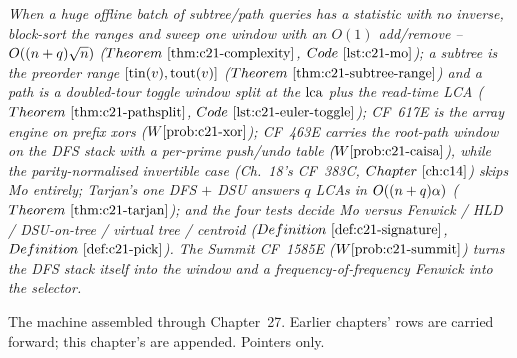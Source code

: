 \begin{recallbox}
\emph{When a huge offline batch of subtree/path queries has a statistic with no inverse,
block-sort the ranges and sweep one window with an \(O(1)\) add/remove --
\(O((n+q)\sqrt n)\) (\(\thmref{c21-complexity}\), \(\coderef{c21-mo}\)); a subtree is
the preorder range \([\operatorname{tin}(v),\operatorname{tout}(v)]\) (\(\thmref{c21-subtree-range}\)) and a path is a
doubled-tour toggle window split at the \(\operatorname{lca}\) plus the read-time LCA
(\(\thmref{c21-pathsplit}\), \(\coderef{c21-euler-toggle}\)); CF~617E is the array engine on
prefix xors (\(\probref{c21-xor}\)); CF~463E carries the root-path window on the DFS
stack with a per-prime push/undo table (\(\probref{c21-caisa}\)), while the
parity-normalised invertible case (Ch.~18's CF~383C, \(\chref{c14}\)) skips Mo
entirely; Tarjan's one DFS \(+\) DSU answers \(q\) LCAs in
\(O((n+q)\alpha)\) (\(\thmref{c21-tarjan}\)); and the four tests decide Mo versus
Fenwick / HLD / DSU-on-tree / virtual tree / centroid (\(\defref{c21-signature}\),
\(\defref{c21-pick}\)). The Summit CF~1585E (\(\probref{c21-summit}\)) turns the DFS stack
itself into the window and a frequency-of-frequency Fenwick into the selector.}
\end{recallbox}


The machine assembled through Chapter~27. Earlier chapters' rows are carried forward;
this chapter's are appended. Pointers only.

